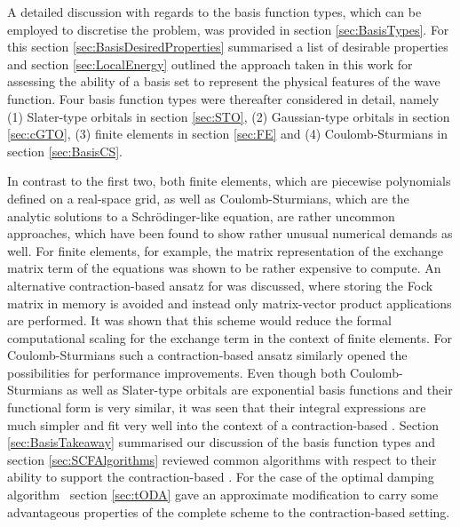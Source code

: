 
A detailed discussion with regards to the basis function types,
which can be employed to discretise the \HF problem,
was provided in section \ref{sec:BasisTypes}.
For this section \ref{sec:BasisDesiredProperties}
summarised a list of desirable properties
and section \ref{sec:LocalEnergy}
outlined the approach taken in this work for
assessing the ability of a basis set to represent the physical
features of the wave function.
Four basis function types were thereafter considered in detail,
namely (1) Slater-type orbitals in section \ref{sec:STO},
(2) Gaussian-type orbitals in section \ref{sec:cGTO},
(3) finite elements in section \ref{sec:FE}
and (4) Coulomb-Sturmians in section \ref{sec:BasisCS}.

In contrast to the first two,
both finite elements,
which are piecewise polynomials defined on a real-space grid,
as well as Coulomb-Sturmians,
which are the analytic solutions to a Schrödinger-like equation,
are rather uncommon approaches,
which have been found to show rather unusual numerical demands as well.
For finite elements, for example,
the matrix representation of the exchange matrix term of the \HF equations
was shown to be rather expensive to compute.
An alternative contraction-based ansatz for \HF was discussed,
where storing the Fock matrix in memory is avoided
and instead only matrix-vector product applications are performed.
It was shown that this scheme would reduce
the formal computational scaling
for the exchange term in the context of finite elements.
For Coulomb-Sturmians such a contraction-based \SCF
ansatz similarly opened the possibilities for performance improvements.
Even though both Coulomb-Sturmians as well as Slater-type
orbitals are exponential basis functions
and their functional form is very similar,
it was seen that their integral expressions are much simpler
and fit very well into the context of a contraction-based \SCF.
Section \ref{sec:BasisTakeaway} summarised our discussion of the basis
function types and section \ref{sec:SCFAlgorithms}
reviewed common \SCF algorithms
with respect to their ability to support the contraction-based \SCF.
For the case of the optimal damping algorithm~\cite{Cances2000a}
section \ref{sec:tODA} gave an approximate modification
to carry some advantageous
properties of the complete scheme to the contraction-based setting.


